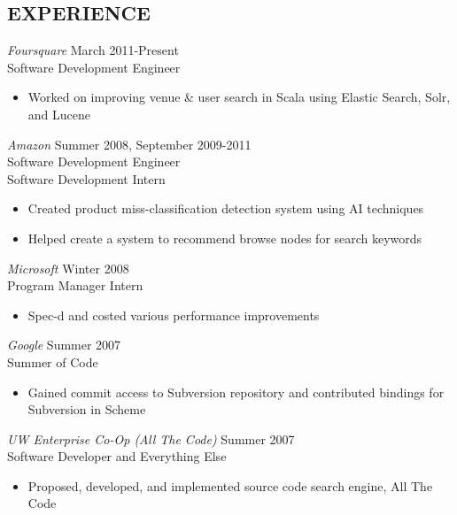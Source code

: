 \documentclass[10pt,line,margin=0.1]{newsres}
\begin{document}
\begin{resume}
\section{EXPERIENCE} {\sl Foursquare} \hfill March 2011-Present \\
                Software Development Engineer
                 \begin{itemize}  \itemsep -2pt %
                 \item Worked on improving venue \& user search in Scala using Elastic Search, Solr, and Lucene
                \end{itemize}
                {\sl Amazon} \hfill            Summer 2008, September 2009-2011 \\
                Software Development Engineer \\
                Software Development Intern
                \begin{itemize}  \itemsep -2pt %
                \item Created product miss-classification detection system using AI techniques
                \item Helped create a system to recommend browse nodes for search keywords
                \end{itemize} 
                {\sl Microsoft} \hfill        Winter 2008 \\
                Program Manager Intern
                \begin{itemize}
                \item Spec-d and costed various performance improvements
                \end{itemize} 
                {\sl Google} \hfill        Summer 2007 \\
                Summer of Code
                  \begin{itemize}
                   \item Gained commit access to Subversion repository and contributed bindings for Subversion in Scheme
                   \end{itemize} 
                {\sl UW Enterprise Co-Op (All The Code)} \hfill Summer 2007 \\
                Software Developer and Everything Else
                \begin{itemize}  \itemsep -2pt %
                  \item{Proposed, developed, and implemented source code search engine, All The Code}

\end{itemize}
\end{resume}
\end{document}
